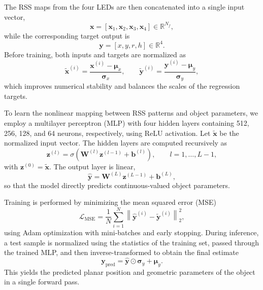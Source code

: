 \documentclass[conference]{IEEEtran}
\begin{document}
The RSS maps from the four LEDs are then concatenated into a single input vector,
\begin{equation}
\mathbf{x}=[\mathbf{x}_1,\mathbf{x}_2,\mathbf{x}_3,\mathbf{x}_4]\in\mathbb{R}^{N_f},
\end{equation}
while the corresponding target output is
\begin{equation}
\mathbf{y}=[x,y,r,h]\in\mathbb{R}^{4}.
\end{equation}
Before training, both inputs and targets are normalized as
\begin{equation}
\tilde{\mathbf{x}}^{(i)}=\frac{\mathbf{x}^{(i)}-\boldsymbol{\mu}_x}{\boldsymbol{\sigma}_x},
\qquad
\tilde{\mathbf{y}}^{(i)}=\frac{\mathbf{y}^{(i)}-\boldsymbol{\mu}_y}{\boldsymbol{\sigma}_y},
\end{equation}
which improves numerical stability and balances the scales of the regression targets.

To learn the nonlinear mapping between RSS patterns and object parameters, we employ a multilayer perceptron (MLP) with four hidden layers containing 512, 256, 128, and 64 neurons, respectively, using ReLU activation. Let $\tilde{\mathbf{x}}$ be the normalized input vector. The hidden layers are computed recursively as
\begin{equation}
\mathbf{z}^{(l)}=\sigma\!\left(\mathbf{W}^{(l)}\mathbf{z}^{(l-1)}+\mathbf{b}^{(l)}\right),\qquad l=1,\dots,L-1,
\end{equation}
with $\mathbf{z}^{(0)}=\tilde{\mathbf{x}}$. The output layer is linear,
\begin{equation}
\hat{\mathbf{y}}=\mathbf{W}^{(L)}\mathbf{z}^{(L-1)}+\mathbf{b}^{(L)},
\end{equation}
so that the model directly predicts continuous-valued object parameters.

Training is performed by minimizing the mean squared error (MSE)
\begin{equation}
\mathcal{L}_{\mathrm{MSE}}=\frac{1}{N}\sum_{i=1}^{N}\left\|\hat{\mathbf{y}}^{(i)}-\tilde{\mathbf{y}}^{(i)}\right\|_2^2,
\end{equation}
using Adam optimization with mini-batches and early stopping. During inference, a test sample is normalized using the statistics of the training set, passed through the trained MLP, and then inverse-transformed to obtain the final estimate
\begin{equation}
\mathbf{y}_{\mathrm{pred}}=\hat{\mathbf{y}}\odot\boldsymbol{\sigma}_y+\boldsymbol{\mu}_y.
\end{equation}
This yields the predicted planar position and geometric parameters of the object in a single forward pass.
\end{document}
